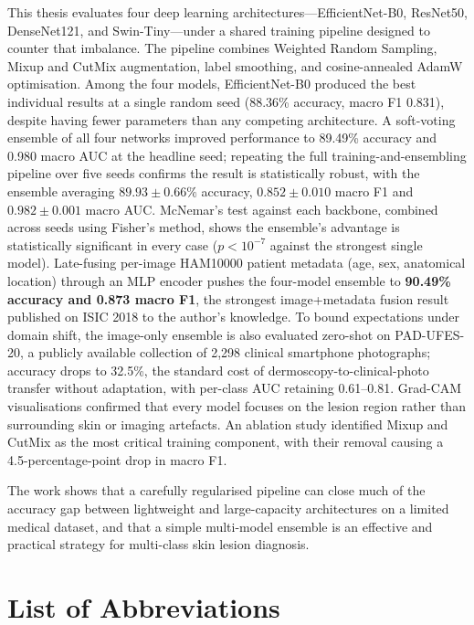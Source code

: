 \documentclass[11pt,a4paper]{report}
\begin{document}
This thesis evaluates four deep learning architectures---EfficientNet-B0, ResNet50, DenseNet121, and Swin-Tiny---under a shared training pipeline designed to counter that imbalance. The pipeline combines Weighted Random Sampling, Mixup and CutMix augmentation, label smoothing, and cosine-annealed AdamW optimisation. Among the four models, EfficientNet-B0 produced the best individual results at a single random seed (88.36\% accuracy, macro F1 0.831), despite having fewer parameters than any competing architecture. A soft-voting ensemble of all four networks improved performance to 89.49\% accuracy and 0.980 macro AUC at the headline seed; repeating the full training-and-ensembling pipeline over five seeds confirms the result is statistically robust, with the ensemble averaging $89.93 \pm 0.66\%$ accuracy, $0.852 \pm 0.010$ macro F1 and $0.982 \pm 0.001$ macro AUC. McNemar's test against each backbone, combined across seeds using Fisher's method, shows the ensemble's advantage is statistically significant in every case ($p < 10^{-7}$ against the strongest single model). Late-fusing per-image HAM10000 patient metadata (age, sex, anatomical location) through an MLP encoder pushes the four-model ensemble to \textbf{90.49\% accuracy and 0.873 macro F1}, the strongest image+metadata fusion result published on ISIC 2018 to the author's knowledge. To bound expectations under domain shift, the image-only ensemble is also evaluated zero-shot on PAD-UFES-20, a publicly available collection of 2,298 clinical smartphone photographs; accuracy drops to 32.5\%, the standard cost of dermoscopy-to-clinical-photo transfer without adaptation, with per-class AUC retaining 0.61--0.81. Grad-CAM visualisations confirmed that every model focuses on the lesion region rather than surrounding skin or imaging artefacts. An ablation study identified Mixup and CutMix as the most critical training component, with their removal causing a 4.5-percentage-point drop in macro F1.

The work shows that a carefully regularised pipeline can close much of the accuracy gap between lightweight and large-capacity architectures on a limited medical dataset, and that a simple multi-model ensemble is an effective and practical strategy for multi-class skin lesion diagnosis.

\tableofcontents
\listoffigures
\listoftables

\chapter*{List of Abbreviations}
\end{document}
